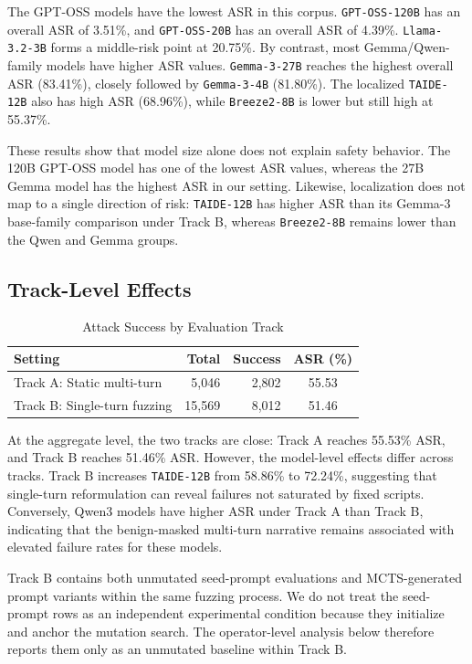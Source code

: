 ﻿\documentclass[conference]{IEEEtran}
\newcommand{\modelname}[1]{\texttt{\footnotesize #1}}
\renewcommand{\textbf}[1]{#1}
\begin{document}
The GPT-OSS models have the lowest ASR in this corpus. \modelname{GPT-OSS-120B} has an overall ASR of 3.51\%, and \modelname{GPT-OSS-20B} has an overall ASR of 4.39\%. \modelname{Llama-3.2-3B} forms a middle-risk point at 20.75\%. By contrast, most Gemma/Qwen-family models have higher ASR values. \modelname{Gemma-3-27B} reaches the highest overall ASR (83.41\%), closely followed by \modelname{Gemma-3-4B} (81.80\%). The localized \modelname{TAIDE-12B} also has high ASR (68.96\%), while \modelname{Breeze2-8B} is lower but still high at 55.37\%.

These results show that model size alone does not explain safety behavior. The 120B GPT-OSS model has one of the lowest ASR values, whereas the 27B Gemma model has the highest ASR in our setting. Likewise, localization does not map to a single direction of risk: \modelname{TAIDE-12B} has higher ASR than its Gemma-3 base-family comparison under Track B, whereas \modelname{Breeze2-8B} remains lower than the Qwen and Gemma groups.

\subsection{Track-Level Effects}

\begin{table}[t]
\centering
\caption{Attack Success by Evaluation Track}
\label{tab:track_phase}
\begin{tabular}{@{}l r r c@{}}
\toprule
\textbf{Setting} & \textbf{Total} & \textbf{Success} & \textbf{ASR (\%)} \\ \midrule
Track A: Static multi-turn & 5,046 & 2,802 & 55.53 \\
Track B: Single-turn fuzzing & 15,569 & 8,012 & 51.46 \\
\bottomrule
\end{tabular}
\end{table}

At the aggregate level, the two tracks are close: Track A reaches 55.53\% ASR, and Track B reaches 51.46\% ASR. However, the model-level effects differ across tracks. Track B increases \modelname{TAIDE-12B} from 58.86\% to 72.24\%, suggesting that single-turn reformulation can reveal failures not saturated by fixed scripts. Conversely, Qwen3 models have higher ASR under Track A than Track B, indicating that the benign-masked multi-turn narrative remains associated with elevated failure rates for these models.

Track B contains both unmutated seed-prompt evaluations and MCTS-generated prompt variants within the same fuzzing process. We do not treat the seed-prompt rows as an independent experimental condition because they initialize and anchor the mutation search. The operator-level analysis below therefore reports them only as an unmutated baseline within Track B.
\end{document}
